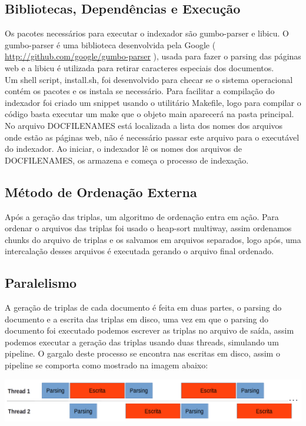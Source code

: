 \documentclass[11pt]{article}
\begin{document}
\subsection{Bibliotecas, Dependências e Execução}
Os pacotes necessários para executar o indexador são gumbo-parser e libicu. O gumbo-parser  é uma biblioteca desenvolvida pela Google ( \url{http://github.com/google/gumbo-parser} ), usada para fazer o parsing das páginas web e a libicu é utilizada para retirar caracteres especiais dos documentos.\\
Um shell script, install.sh, foi desenvolvido para checar se o sistema operacional contém os pacotes e os instala se necessário.
Para facilitar a compilação do indexador foi criado um snippet usando o utilitário Makefile, logo para compilar o código basta executar um make que o objeto main aparecerá na pasta principal.\\
No arquivo DOCFILENAMES está localizada a lista dos nomes dos arquivos onde estão as páginas web, não é necessário passar este arquivo para o executável do indexador. Ao iniciar, o indexador lê os nomes dos arquivos de DOCFILENAMES, os armazena e começa o processo de indexação.


\subsection{Método de Ordenação Externa}
Após a geração das triplas, um algoritmo de ordenação entra em ação. Para ordenar o arquivos das triplas foi usado o heap-sort multiway, assim ordenamos chunks do arquivo de triplas e os salvamos em arquivos separados, logo após, uma intercalação desses arquivos é executada gerando o arquivo final ordenado.


\subsection{Paralelismo}
A geração de triplas de cada documento é feita em duas partes, o parsing do documento e a escrita das triplas em disco, uma vez em que o parsing do documento foi executado podemos escrever as triplas no arquivo de saída, assim podemos executar a geração das triplas usando duas threads, simulando um pipeline. O gargalo deste processo se encontra nas escritas em disco, assim o pipeline se comporta como mostrado na imagem abaixo:


\begin{center}
\includegraphics[scale=0.41]{Pipelining.png}
\end{center}
\end{document}
